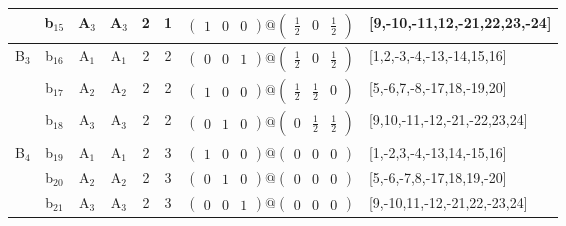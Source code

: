 \documentclass[fleqn,10pt,landscape]{article}
\begin{document}
\begin{itemize}
\begin{center}
\begin{longtable}{cc|cc|c|c|c|l}
& b$_{15}$ & A$_{3}$ & A$_{3}$ & 2 & 1 & $\begin{pmatrix} 1 & 0 & 0 \end{pmatrix}@\begin{pmatrix} \frac{1}{2} & 0 & \frac{1}{2} \end{pmatrix}$ & [9,-10,-11,12,-21,22,23,-24] \\ \hline
B$_{3}$ & b$_{16}$ & A$_{1}$ & A$_{1}$ & 2 & 2 & $\begin{pmatrix} 0 & 0 & 1 \end{pmatrix}@\begin{pmatrix} \frac{1}{2} & 0 & \frac{1}{2} \end{pmatrix}$ & [1,2,-3,-4,-13,-14,15,16] \\
& b$_{17}$ & A$_{2}$ & A$_{2}$ & 2 & 2 & $\begin{pmatrix} 1 & 0 & 0 \end{pmatrix}@\begin{pmatrix} \frac{1}{2} & \frac{1}{2} & 0 \end{pmatrix}$ & [5,-6,7,-8,-17,18,-19,20] \\
& b$_{18}$ & A$_{3}$ & A$_{3}$ & 2 & 2 & $\begin{pmatrix} 0 & 1 & 0 \end{pmatrix}@\begin{pmatrix} 0 & \frac{1}{2} & \frac{1}{2} \end{pmatrix}$ & [9,10,-11,-12,-21,-22,23,24] \\ \hline
B$_{4}$ & b$_{19}$ & A$_{1}$ & A$_{1}$ & 2 & 3 & $\begin{pmatrix} 1 & 0 & 0 \end{pmatrix}@\begin{pmatrix} 0 & 0 & 0 \end{pmatrix}$ & [1,-2,3,-4,-13,14,-15,16] \\
& b$_{20}$ & A$_{2}$ & A$_{2}$ & 2 & 3 & $\begin{pmatrix} 0 & 1 & 0 \end{pmatrix}@\begin{pmatrix} 0 & 0 & 0 \end{pmatrix}$ & [5,-6,-7,8,-17,18,19,-20] \\
& b$_{21}$ & A$_{3}$ & A$_{3}$ & 2 & 3 & $\begin{pmatrix} 0 & 0 & 1 \end{pmatrix}@\begin{pmatrix} 0 & 0 & 0 \end{pmatrix}$ & [9,-10,11,-12,-21,22,-23,24] \\
\end{longtable}
\end{center}


\end{itemize}
\end{document}

